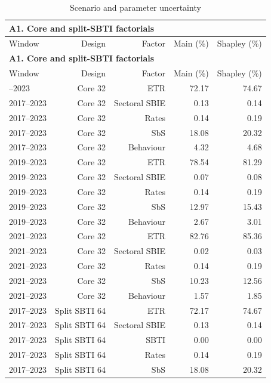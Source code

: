 {\small\setlength{\LTpre}{4pt}\setlength{\LTpost}{4pt}
\begin{longtable}{@{}lrrrr@{}}
\caption{Scenario and parameter uncertainty}\label{tab:tab_v2_factorial_globe_and_total_variance} \\
\multicolumn{5}{l}{\textbf{A1. Core and split-SBTI factorials}} \\
\toprule
Window & Design & Factor & Main (\%) & Shapley (\%) \\
\midrule
\endfirsthead
\multicolumn{5}{l}{\textbf{A1. Core and split-SBTI factorials}} \\
\toprule
Window & Design & Factor & Main (\%) & Shapley (\%) \\
\midrule
\endhead
\midrule
\endfoot
\bottomrule
\endlastfoot
2017–2023 & Core 32 & ETR & 72.17 & 74.67 \\
2017–2023 & Core 32 & Sectoral SBIE &  0.13 &  0.14 \\
2017–2023 & Core 32 & Rates &  0.14 &  0.19 \\
2017–2023 & Core 32 & SbS & 18.08 & 20.32 \\
2017–2023 & Core 32 & Behaviour &  4.32 &  4.68 \\
2019–2023 & Core 32 & ETR & 78.54 & 81.29 \\
2019–2023 & Core 32 & Sectoral SBIE &  0.07 &  0.08 \\
2019–2023 & Core 32 & Rates &  0.14 &  0.19 \\
2019–2023 & Core 32 & SbS & 12.97 & 15.43 \\
2019–2023 & Core 32 & Behaviour &  2.67 &  3.01 \\
2021–2023 & Core 32 & ETR & 82.76 & 85.36 \\
2021–2023 & Core 32 & Sectoral SBIE &  0.02 &  0.03 \\
2021–2023 & Core 32 & Rates &  0.14 &  0.19 \\
2021–2023 & Core 32 & SbS & 10.23 & 12.56 \\
2021–2023 & Core 32 & Behaviour &  1.57 &  1.85 \\
2017–2023 & Split SBTI 64 & ETR & 72.17 & 74.67 \\
2017–2023 & Split SBTI 64 & Sectoral SBIE &  0.13 &  0.14 \\
2017–2023 & Split SBTI 64 & SBTI &  0.00 &  0.00 \\
2017–2023 & Split SBTI 64 & Rates &  0.14 &  0.19 \\
2017–2023 & Split SBTI 64 & SbS & 18.08 & 20.32 \\

\end{longtable}}
